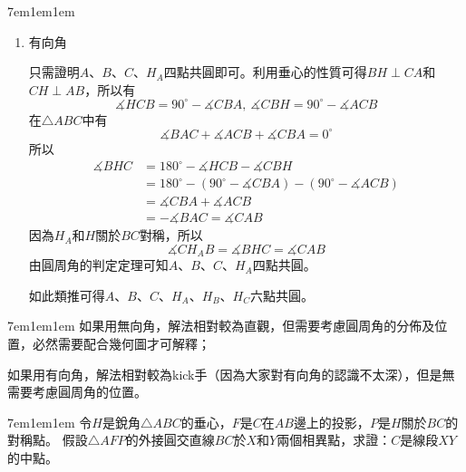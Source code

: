 \documentclass[12pt]{article}
\begin{document}
\begin{mybox}[Answer 3]{7em}{1em}{1em}
\begin{enumerate}[label=方法 \arabic*：]
$$        $$
        結合$H_C$和$H$關於$AB$對稱可得
        \begin{align*}
            \angle{AH_CB}&=\angle{BHA}\\
            &=180^{\circ}-\angle{HAB}-\angle{ABH}\\
            &=180^{\circ}-\left(\angle{CBA}+90^{\circ}\right)-\left(\angle{BAC}-90^{\circ}\right)\\
            &=180^{\circ}-\angle{CBA}-\angle{BAC}\\
            &=\angle{ACB}
        \end{align*}

        \item 有向角
        
        只需證明$A$、$B$、$C$、$H_A$四點共圓即可。利用垂心的性質可得$BH\perp CA$和$CH\perp AB$，所以有
        $$
            \measuredangle{HCB}=90^{\circ}-\measuredangle{CBA},\ \measuredangle{CBH}=90^{\circ}-\measuredangle{ACB}
        $$
        在$\triangle{ABC}$中有
        $$
            \measuredangle{BAC}+\measuredangle{ACB}+\measuredangle{CBA}=0^{\circ}
        $$
        所以
        \begin{align*}
            \measuredangle{BHC}&=180^{\circ}-\measuredangle{HCB}-\measuredangle{CBH}\\
            &=180^{\circ}-\left(90^{\circ}-\measuredangle{CBA}\right)-\left(90^{\circ}-\measuredangle{ACB}\right)\\
            &=\measuredangle{CBA}+\measuredangle{ACB}\\
            &=-\measuredangle{BAC}=\measuredangle{CAB}
        \end{align*}
        因為$H_A$和$H$關於$BC$對稱，所以
        $$
            \measuredangle{CH_AB}=\measuredangle{BHC}=\measuredangle{CAB}
        $$
        由圓周角的判定定理可知$A$、$B$、$C$、$H_A$四點共圓。

        如此類推可得$A$、$B$、$C$、$H_A$、$H_B$、$H_C$六點共圓。
    \end{enumerate}
 
\end{mybox}
\begin{mybox}[Analysis 3]{7em}{1em}{1em}
    如果用無向角，解法相對較為直觀，但需要考慮圓周角的分佈及位置，必然需要配合幾何圖才可解釋；

    如果用有向角，解法相對較為kick手（因為大家對有向角的認識不太深），但是無需要考慮圓周角的位置。
\end{mybox}
\begin{mybox}[Problem 4*]{7em}{1em}{1em}
    令$H$是銳角$\triangle{ABC}$的垂心，$F$是$C$在$AB$邊上的投影，$P$是$H$關於$BC$的對稱點。
    假設$\triangle{AFP}$的外接圓交直線$BC$於$X$和$Y$兩個相異點，求證：$C$是線段$XY$的中點。
\end{mybox}
\end{document}
